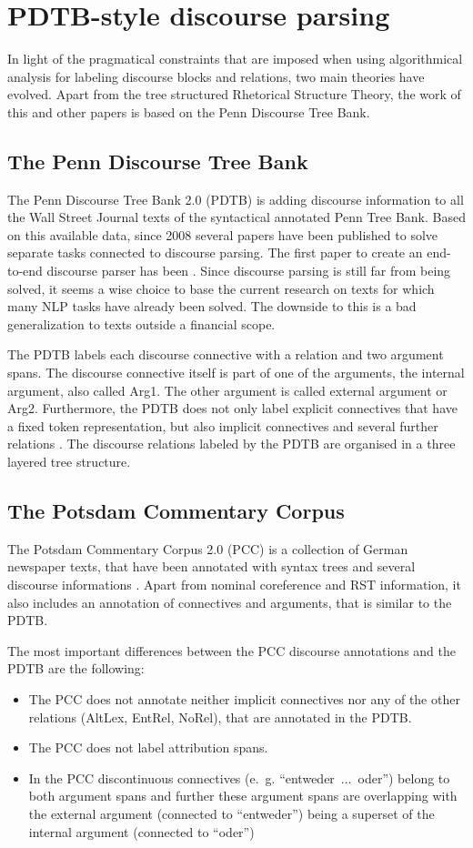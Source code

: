 \documentclass[10pt,a4paper]{article}
\begin{document}
\section{PDTB-style discourse parsing}\label{DiscParse}
In light of the pragmatical constraints that are imposed when using algorithmical analysis for labeling discourse blocks and relations, two main theories have evolved. Apart from the tree structured Rhetorical Structure Theory, the work of this and other papers is based on the Penn Discourse Tree Bank.

\subsection{The Penn Discourse Tree Bank}
The Penn Discourse Tree Bank 2.0 (PDTB) is adding discourse information to all the Wall Street Journal texts of the syntactical annotated Penn Tree Bank. Based on this available data, since 2008 several papers have been published to solve separate tasks connected to discourse parsing. The first paper to create an end-to-end discourse parser has been \cite{Lin12}.
Since discourse parsing is still far from being solved, it seems a wise choice to base the current research on texts for which many NLP tasks have already been solved. The downside to this is a bad generalization to texts outside a financial scope.

The PDTB labels each discourse connective with a relation and two argument spans. The discourse connective itself is part of one of the arguments, the internal argument, also called Arg1. The other argument is called external argument or Arg2. Furthermore, the PDTB does not only label explicit connectives that have a fixed token representation, but also implicit connectives and several further relations \cite{PDTB}. The discourse relations labeled by the PDTB are organised in a three layered tree structure.

\subsection{The Potsdam Commentary Corpus}\label{PCC}
The Potsdam Commentary Corpus 2.0 (PCC) is a collection of German newspaper texts, that have been annotated with syntax trees and several discourse informations \cite{stede2014pcc}. Apart from nominal coreference and RST information, it also includes an annotation of connectives and arguments, that is similar to the PDTB.

The most important differences between the PCC discourse annotations and the PDTB are the following:
\begin{itemize}
\item The PCC does not annotate neither implicit connectives nor any of the other relations (AltLex, EntRel, NoRel), that are annotated in the PDTB.
\item The PCC does not label attribution spans.
\item In the PCC discontinuous connectives (e.~g. ``entweder~...~oder'') belong to both argument spans and further these argument spans are overlapping with the external argument (connected to ``entweder'') being a superset of the internal argument (connected to ``oder'')
\end{itemize}
\end{document}
